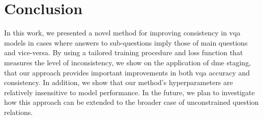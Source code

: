 \section{Conclusion}

In this work, we presented a novel method for improving consistency in \gls{vqa} models in cases where answers to sub-questions imply those of main questions and vice-versa. By using a tailored training procedure and loss function that measures the level of inconsistency, we show on the application of \gls{dme} staging, that our approach provides important improvements in both \gls{vqa} accuracy and consistency. In addition, we show that our method's hyperparameters are relatively insensitive to model performance. In the future, we plan to investigate how this approach can be extended to the broader case of unconstrained question relations.